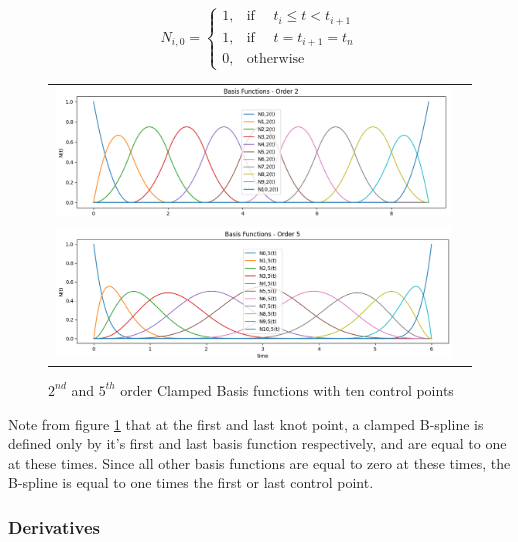 \documentclass{article}
\begin{document}
 \begin{equation} \label{eq:Basis function equation zeros}
      N_{i,0} =   \begin{cases} 1, &  \text{if } \quad t_i \leq t < t_{i+1} \\
                            1, & \text{if } \quad t = t_{i+1} = t_n \\
                            0, & \text{otherwise} \end{cases}
  \end{equation}
  
\begin{figure}[H]
\begin{tabular}{ll}
\includegraphics[scale=.39]{BasisFunctionsOrder2Clamped.png}
\\
\includegraphics[scale=.39]{BasisFunctionsOrder5Clamped.png}
\end{tabular}
\caption{$2^{nd}$ and $5^{th}$ order Clamped Basis functions with ten control points}
\label{Fig:Clamped Basis Functions}
\end{figure}

Note from figure \ref{Fig:Clamped Basis Functions} that at the first and last knot point, a clamped B-spline is defined only by it's first and last basis function respectively, and are equal to one at these times. Since all other basis functions are equal to zero at these times, the B-spline is equal to one times the first or last control point.

\subsubsection{Derivatives}
\end{document}
